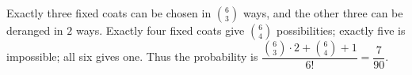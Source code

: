 Exactly three fixed coats can be chosen in $\binom63 $ ways, and the other three can be deranged in $ 2 $ ways. Exactly four fixed coats give $\binom64 $ possibilities; exactly five is impossible; all six gives one. Thus the probability is $\dfrac{\binom63\cdot2+\binom64+1}{6!}=\boxed{\dfrac{7}{90}}$.
